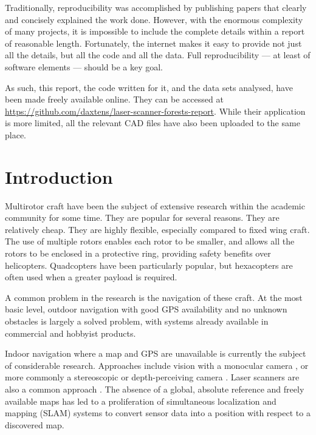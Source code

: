 \documentclass[12pt,oneside,a4paper]{book}
\begin{document}
Traditionally, reproducibility was accomplished by publishing papers
that clearly and concisely explained the work done. However, with the
enormous complexity of many projects, it is impossible to include the
complete details within a report of reasonable length. Fortunately,
the internet makes it easy to provide not just all the details, but
all the code and all the data. Full reproducibility --- at least of
software elements --- should be a key goal.

As such, this report, the code written for it, and the data sets
analysed, have been made freely available online. They can be accessed
at \url{https://github.com/daxtens/laser-scanner-forests-report}.
While their application is more limited, all the relevant CAD files
have also been uploaded to the same place.



\chapter{Introduction}
\label{cha:intro}


Multirotor craft have been the subject of extensive research within
the academic community for some time. They are popular for several
reasons. They are relatively cheap. They are highly flexible,
especially compared to fixed wing craft. The use of multiple rotors
enables each rotor to be smaller, and allows all the rotors to be
enclosed in a protective ring, providing safety benefits over
helicopters. Quadcopters have been particularly popular, but
hexacopters are often used when a greater payload is required.

A common problem in the research is the navigation of these craft. At
the most basic level, outdoor navigation with good GPS availability
and no unknown obstacles is largely a solved problem, with systems
already available in commercial and hobbyist products.

Indoor navigation where a map and GPS are unavailable is currently the
subject of considerable research. Approaches include vision with a
monocular camera \cite{5152680}, or more commonly a stereoscopic or
depth-perceiving camera \cite{huang2011visual}. Laser scanners are
also a common approach \cite{achtelik2009stereo}. The absence of a
global, absolute reference and freely available maps has led to a
proliferation of simultaneous localization and mapping (SLAM) systems
to convert sensor data into a position with respect to a discovered
map.
\end{document}
